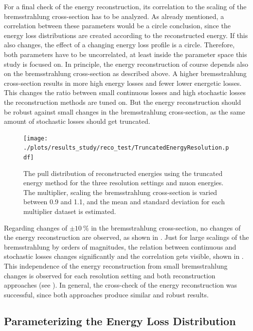For a final check of the energy reconstruction, its correlation to the scaling of the bremsstrahlung cross-section has to be analyzed.
As already mentioned, a correlation between these parameters would be a circle conclusion, since the energy loss distributions are created according to the reconstructed energy.
If this also changes, the effect of a changing energy loss profile is a circle.
Therefore, both parameters have to be uncorrelated, at least inside the parameter space this study is focused on.
In principle, the energy reconstruction of course depends also on the bremsstrahlung cross-section as described above.
A higher bremsstrahlung cross-section results in more high energy losses and fewer lower energetic losses.
This changes the ratio between small continuous losses and high stochastic losses the reconstruction methods are tuned on.
But the energy reconstruction should be robust against small changes in the bremsstrahlung cross-section, as the same amount of stochastic losses should get truncated.
\begin{figure}
    \centering
    \texttt{[image: ./plots/results\_study/reco\_test/TruncatedEnergyResolution.pdf]}
    \caption{The pull distribution of reconstructed energies using the truncated energy method for the three resolution settings and muon energies. The multiplier, scaling the bremsstrahlung cross-section is varied between \num{0.9} and \num{1.1}, and the mean and standard deviation for each multiplier dataset is estimated.}
    \label{fig:study_ereco_pull_te}
\end{figure}

Regarding changes of $\pm \SI{10}{\percent}$ in the bremsstrahlung cross-section, no changes of the energy reconstruction are observed, as shown in .
Just for large scalings of the bremsstrahlung by orders of magnitudes, the relation between continuous and stochastic losses changes significantly and the correlation gets visible, shown in .
This independence of the energy reconstruction from small bremsstrahlung changes is observed for each resolution setting and both reconstruction approaches (see ).
In general, the cross-check of the energy reconstruction was successful, since both approaches produce similar and robust results.

%

\subsection{Parameterizing the Energy Loss Distribution}

